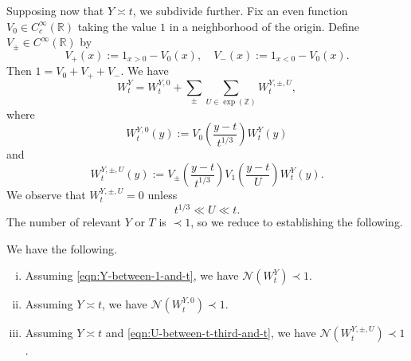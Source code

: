 \documentclass[reqno]{amsart} 
\begin{document}
Supposing now that $Y \asymp t$, we subdivide further.  Fix an even function $V_0 \in C_c^\infty(\mathbb{R})$ taking the value $1$ in a neighborhood of the origin.  Define $V_{\pm} \in C^\infty(\mathbb{R})$ by
\begin{equation*}
  V_+(x) := 1_{x > 0} - V_0(x), \quad V_-(x) := 1_{x<0} - V_0(x).
\end{equation*}
Then $1 = V_0 + V_+ + V_-$.  We have
\begin{equation*}
  W_t^{Y} =
  W_t^{Y,0}
  +
  \sum _{\pm}
  \sum _{U \in \exp(\mathbb{Z})}
  W_t^{Y,\pm,U},
\end{equation*}
where
\begin{equation*}
  W_t^{Y,0}(y) := V_0\left(\frac{y - t}{t ^{1/3} }\right)  W_t^Y(y)
\end{equation*}
and
\begin{equation*}
  W_t^{Y,\pm,U}(y) :=
  V_{\pm} \left(\frac{y - t}{t ^{1/3} }\right)
  V_1 \left( \frac{y - t}{U} \right) W_t^Y(y).
\end{equation*}
We observe that $W_t^{Y,\pm, U} = 0$ unless
\begin{equation}\label{eqn:U-between-t-third-and-t}
  t ^{1/3} \ll U \ll t.
\end{equation}
The number of relevant $Y$ or $T$ is $\prec 1$, so we reduce to establishing the following.
\begin{proposition}\label{proposition:reduction-after-dyadic-decopm}
  We have the following.
  \begin{enumerate}[(i)]
  \item Assuming \eqref{eqn:Y-between-1-and-t}, we have $\mathcal{N} (W _t ^Y ) \prec 1$.
  \item Assuming $Y \asymp t$, we have $\mathcal{N} (W _t ^{Y, 0}) \prec 1$.
  \item Assuming $Y \asymp t$ and \eqref{eqn:U-between-t-third-and-t}, we have $\mathcal{N} (W _{t} ^{Y, \pm, U}) \prec 1$.
  \end{enumerate}
\end{proposition}
\end{document}
